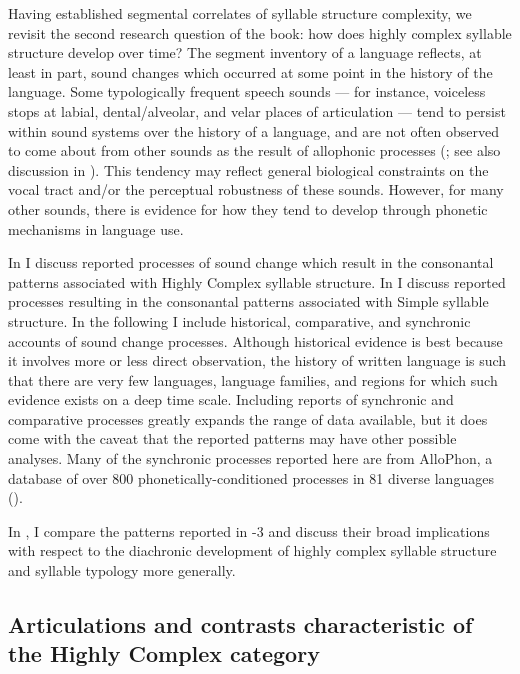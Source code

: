   Having established segmental correlates of syllable structure complexity, we revisit the second research question of the book: how does highly complex syllable structure develop over time? The segment inventory of a language reflects, at least in part, sound changes which occurred at some point in the history of the language. Some typologically frequent speech sounds — for instance, voiceless stops at labial, dental/alveolar, and velar places of articulation — tend to persist within sound systems over the history of a language, and are not often observed to come about from other sounds as the result of allophonic processes (\citealt{Bybee2015a}; see also discussion in ). This tendency may reflect general biological constraints on the vocal tract and/or the perceptual robustness of these sounds. However, for many other sounds, there is evidence for how they tend to develop through phonetic mechanisms in language use. 

  In  I discuss reported processes of sound change which result in the consonantal patterns associated with Highly Complex syllable structure. In  I discuss reported processes resulting in the consonantal patterns associated with Simple syllable structure. In the following I include historical, comparative, and synchronic accounts of sound change processes. Although historical evidence is best because it involves more or less direct observation, the history of written language is such that there are very few languages, language families, and regions for which such evidence exists on a deep time scale. Including reports of synchronic and comparative processes greatly expands the range of data available, but it does come with the caveat that the reported patterns may have other possible analyses. Many of the synchronic processes reported here are from AlloPhon, a database of over 800 phonetically-conditioned processes in 81 diverse languages (\citealt{BybeeEasterday2019}).

  In , I compare the patterns reported in -3 and discuss their broad implications with respect to the diachronic development of highly complex syllable structure and syllable typology more generally.

\subsection{Articulations and contrasts characteristic of the Highly Complex category} \label{sec:4.5.2}

